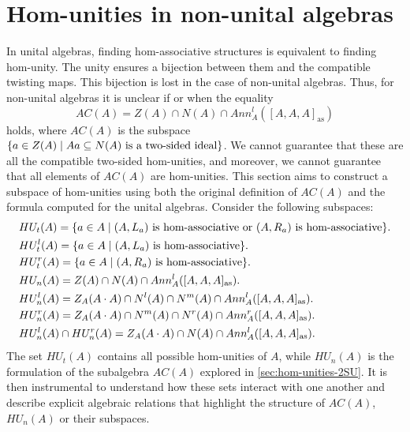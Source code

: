 \documentclass[12pt]{article}
\begin{document}
		
		
		\section{Hom-unities in non-unital algebras}\label{sec:non-unital}
		
		In unital algebras, finding hom-associative structures is equivalent to finding hom-unity. The unity ensures a bijection between them and the compatible twisting maps. This bijection is lost in the case of non-unital algebras. Thus, for non-unital algebras it is unclear if or when the equality
		\begin{equation*}
			AC(A)=Z(A)\cap N(A)\cap Ann_A^l([A,A,A]_{\mathrm{as}})
		\end{equation*}
		holds, where $AC(A)$ is the subspace $\{a\in Z(A)\mid Aa\subseteq N(A) \textnormal{ is a two-sided ideal}\}$. We cannot guarantee that these are all the compatible two-sided hom-unities, and moreover, we cannot guarantee that all elements of $AC(A)$ are hom-unities. This section aims to construct a subspace of hom-unities using both the original definition of $AC(A)$ and the formula computed for the unital algebras.  Consider the following subspaces:
		\begin{align*}
			& HU_t(A)=\{a\in A\mid (A,L_a) \textnormal{ is hom-associative or } (A,R_a) \textnormal{ is hom-associative}\}. \\
			& HU_t^l(A)=\{a\in A\mid (A,L_a) \textnormal{ is hom-associative} \}. \\
			& HU_t^r(A)=\{a\in A\mid (A,R_a) \textnormal{ is hom-associative} \}. \\
			& HU_n(A)=Z(A)\cap N(A)\cap Ann_A^l([A,A,A]_{\mathrm{as}}). \\
			& HU_n^l(A)=Z_A(A\cdot A)\cap N^l(A)\cap N^m(A)\cap Ann_A^l([A,A,A]_{\mathrm{as}}). \\
			& HU_n^r(A)=Z_A(A\cdot A)\cap N^m(A)\cap N^r(A)\cap Ann_A^r([A,A,A]_{\mathrm{as}}). \\
			& HU_n^l(A)\cap HU_n^r(A)=Z_A(A\cdot A)\cap N(A)\cap Ann_A^l([A,A,A]_{\mathrm{as}}).
		\end{align*}
		The set $HU_t(A)$ contains all possible hom-unities of $A$, while $HU_n(A)$ is the  formulation of the subalgebra $AC(A)$ explored in \cref{sec:hom-unities-2SU}. It is then instrumental to understand how these sets interact with one another and describe explicit algebraic relations that highlight the structure of $AC(A)$, $HU_n(A)$ or their subspaces.
\end{document}
